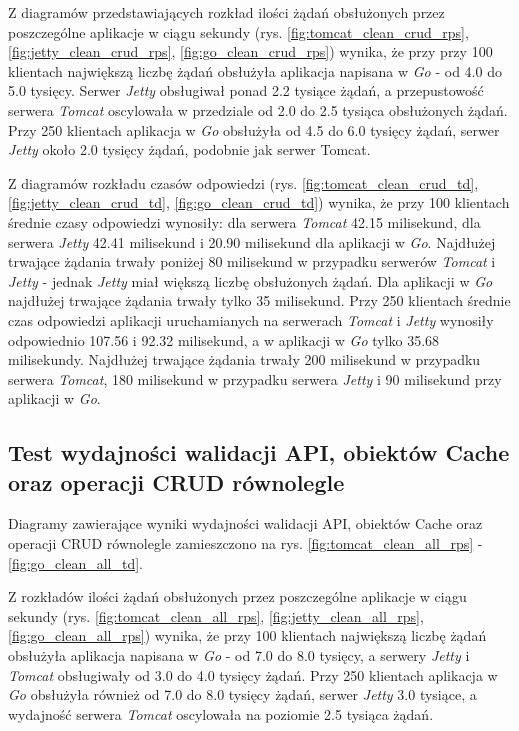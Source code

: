 Z diagramów przedstawiających rozkład ilości żądań obsłużonych przez poszczególne aplikacje w ciągu sekundy (rys. \ref{fig:tomcat_clean_crud_rps}, \ref{fig:jetty_clean_crud_rps}, \ref{fig:go_clean_crud_rps}) wynika, że przy przy 100 klientach największą liczbę żądań obsłużyła aplikacja napisana w \textsl{Go} - od 4.0 do 5.0 tysięcy. Serwer \textsl{Jetty} obsługiwał ponad 2.2 tysiące żądań, a przepustowość serwera \textsl{Tomcat} oscylowała w przedziale od 2.0 do 2.5 tysiąca obsłużonych żądań. Przy 250 klientach aplikacja w \textsl{Go} obsłużyła od 4.5 do 6.0 tysięcy żądań, serwer \textsl{Jetty} około 2.0 tysięcy żądań, podobnie jak serwer Tomcat.

Z diagramów rozkładu czasów odpowiedzi (rys. \ref{fig:tomcat_clean_crud_td}, \ref{fig:jetty_clean_crud_td}, \ref{fig:go_clean_crud_td}) wynika, że przy 100 klientach średnie czasy odpowiedzi wynosiły: dla serwera \textsl{Tomcat} 42.15  milisekund, dla serwera \textsl{Jetty} 42.41  milisekund i 20.90 milisekund dla aplikacji w \textsl{Go}.  Najdłużej trwające żądania trwały poniżej 80 milisekund w przypadku serwerów \textsl{Tomcat} i \textsl{Jetty} - jednak \textsl{Jetty} miał większą liczbę obsłużonych żądań. Dla aplikacji w \textsl{Go} najdłużej trwające żądania trwały tylko 35 milisekund. Przy 250 klientach średnie czas odpowiedzi aplikacji uruchamianych na serwerach \textsl{Tomcat} i \textsl{Jetty}  wynosiły  odpowiednio 107.56 i 92.32 milisekund, a w aplikacji w \textsl{Go} tylko 35.68 milisekundy. Najdłużej trwające żądania trwały 200 milisekund w przypadku serwera \textsl{Tomcat}, 180 milisekund w przypadku serwera \textsl{Jetty} i 90 milisekund przy aplikacji w \textsl{Go}.

% 
\clearpage

\subsection{Test wydajności walidacji API, obiektów Cache oraz operacji CRUD równolegle}
Diagramy zawierające wyniki wydajności walidacji API, obiektów Cache oraz operacji CRUD równolegle zamieszczono na rys. \ref{fig:tomcat_clean_all_rps} - \ref{fig:go_clean_all_td}.                                                                  

Z rozkładów ilości żądań obsłużonych przez poszczególne aplikacje w ciągu sekundy (rys. \ref{fig:tomcat_clean_all_rps}, \ref{fig:jetty_clean_all_rps}, \ref{fig:go_clean_all_rps}) wynika, że przy 100 klientach największą liczbę żądań obsłużyła aplikacja napisana w \textsl{Go} - od 7.0 do 8.0 tysięcy, a serwery \textsl{Jetty} i \textsl{Tomcat} obsługiwały od 3.0 do 4.0  tysięcy żądań. Przy 250 klientach aplikacja w \textsl{Go} obsłużyła również od 7.0 do 8.0 tysięcy żądań, serwer \textsl{Jetty} 3.0 tysiące, a wydajność serwera \textsl{Tomcat} oscylowała na poziomie 2.5 tysiąca żądań. 
 
